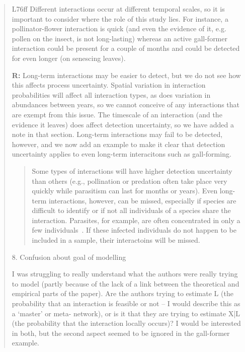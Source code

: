 \documentclass[12pt]{letter}
\newenvironment{refquote}{\bigskip \begin{it}}{\end{it}\smallskip}
\begin{document}
\begin{quotation}
	\begin{refquote}
	L76ff Different interactions occur at different temporal scales, so it is important to consider where the role of this study lies. For instance, a pollinator-flower interaction is quick (and even the evidence of it, e.g. pollen on the insect, is not long-lasting) whereas an active gall-former interaction could be present for a couple of months and could be detected for even longer (on senescing leaves).
	\end{refquote}


	\textbf{R:} Long-term interactions may be easier to detect, but we do not see how this affects process uncertainty. Spatial variation in interaction probabilities will affect all interaction types, as does variation in abundances between years, so we cannot conceive of any interactions that are exempt from this issue. The timescale of an interaction (and the evidence it leaves) does affect detection uncertainty, so we have added a note in that section. Long-term interactions may fail to be detected, however, and we now add an example to make it clear that detection uncertainty applies to even long-term interacitons such as gall-forming.

		\begin{quotation}

			Some types of interactions will have higher detection uncertainty than others (e.g., pollination or predation often take place very quickly while parasitism can last for months or years). Even long-term interactions, however, can be missed, especially if species are difficult to identify or if not all individuals of a species share the interaction. Parasites, for example, are often concentrated in only a few individuals~\citep{Lagrue2017}. If these infected individuals do not happen to be included in a sample, their interactoins will be missed.

		\end{quotation}

	8. Confusion about goal of modelling

	\begin{refquote}
	I was struggling to really understand what the authors were really trying to model (partly because of the lack of a link between the theoretical and empirical parts of the paper). Are the authors trying to estimate L (the probability that an interaction is feasible or not – I would describe this as a ‘master’ or meta- network), or is it that they are trying to estimate X|L (the probability that the interaction locally occurs)? I would be interested in both, but the second aspect seemed to be ignored in the gall-former example.
	\end{refquote}


\end{quotation}
\end{document}
